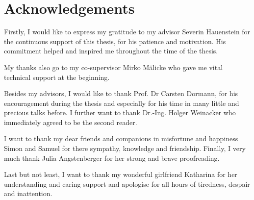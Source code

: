 \chapter*{Acknowledgements}

\label{ch:Acknowledgements}


Firstly, I would like to express my gratitude to my advisor Severin Hauenstein for the continuous support of this thesis, for his patience and motivation. His commitment helped and inspired me throughout the time of the thesis.

My thanks also go to my co-supervisor Mirko Mälicke who gave me vital technical support at the beginning.

Besides my advisors, I would like to thank Prof. Dr Carsten Dormann, for his encouragement during the thesis and especially for his time in many little and precious talks before. 
I further want to thank Dr.-Ing. Holger Weinacker who immediately agreed to be the second reader.

I want to thank my dear friends and companions in misfortune and happiness Simon and Samuel for there sympathy, knowledge and friendship.
Finally, I very much thank Julia Angstenberger for her strong and brave proofreading.

Last but not least, I want to thank my wonderful girlfriend Katharina for her understanding and caring support and apologise for all hours of tiredness, despair and inattention.








